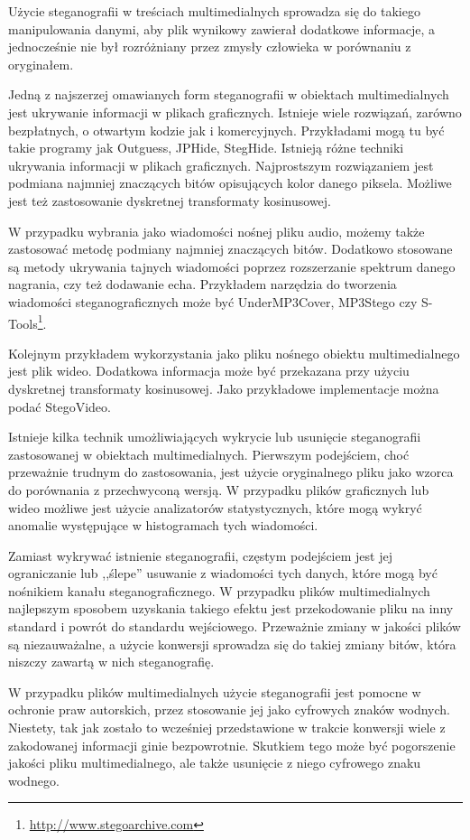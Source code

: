 \documentclass[a4paper,12pt,twoside,openany]{report}
\begin{document}
Użycie steganografii w treściach multimedialnych sprowadza się do takiego 
manipulowania danymi, aby plik wynikowy zawierał dodatkowe informacje, a 
jednocześnie nie był rozróżniany przez zmysły człowieka w porównaniu z 
oryginałem.

Jedną z najszerzej omawianych form steganografii w obiektach multimedialnych 
jest ukrywanie informacji w plikach graficznych. Istnieje wiele rozwiązań, 
zarówno bezpłatnych, o otwartym kodzie jak i komercyjnych. Przykładami mogą tu 
być takie programy jak Outguess, JPHide, StegHide. Istnieją różne techniki 
ukrywania informacji w plikach graficznych. Najprostszym rozwiązaniem jest 
podmiana najmniej znaczących bitów opisujących kolor danego piksela. Możliwe 
jest też zastosowanie dyskretnej transformaty kosinusowej.

W przypadku wybrania jako wiadomości nośnej pliku audio, możemy także zastosować 
metodę podmiany najmniej znaczących bitów. Dodatkowo stosowane są metody 
ukrywania tajnych wiadomości poprzez rozszerzanie spektrum danego nagrania, czy 
też dodawanie echa. Przykładem narzędzia do tworzenia wiadomości 
steganograficznych może być UnderMP3Cover, MP3Stego czy 
S-Tools\footnote{\url{http://www.stegoarchive.com}}.

Kolejnym przykładem wykorzystania jako pliku nośnego obiektu multimedialnego 
jest plik wideo. Dodatkowa informacja może być przekazana przy użyciu dyskretnej 
transformaty kosinusowej. Jako przykładowe implementacje można podać StegoVideo.

Istnieje kilka technik umożliwiających wykrycie lub usunięcie steganografii 
zastosowanej w obiektach multimedialnych. Pierwszym podejściem, choć przeważnie 
trudnym do zastosowania, jest użycie oryginalnego pliku jako wzorca do 
porównania z przechwyconą wersją. W przypadku plików graficznych lub wideo 
możliwe jest użycie analizatorów statystycznych, które mogą wykryć anomalie 
występujące w histogramach tych wiadomości.

Zamiast wykrywać istnienie steganografii, częstym podejściem jest jej 
ograniczanie lub ,,ślepe'' usuwanie z wiadomości tych danych, które mogą być 
nośnikiem kanału steganograficznego. W przypadku plików multimedialnych 
najlepszym sposobem uzyskania takiego efektu jest przekodowanie pliku na inny 
standard i powrót do standardu wejściowego. Przeważnie zmiany w jakości plików 
są niezauważalne, a użycie konwersji sprowadza się do takiej zmiany bitów, która 
niszczy zawartą w nich steganografię.

W przypadku plików multimedialnych użycie steganografii jest pomocne w ochronie 
praw autorskich, przez stosowanie jej jako cyfrowych znaków wodnych. Niestety, 
tak jak zostało to wcześniej przedstawione w trakcie konwersji wiele z 
zakodowanej informacji ginie bezpowrotnie. Skutkiem tego może być pogorszenie 
jakości pliku multimedialnego, ale także usunięcie z niego cyfrowego znaku 
wodnego.
\end{document}
